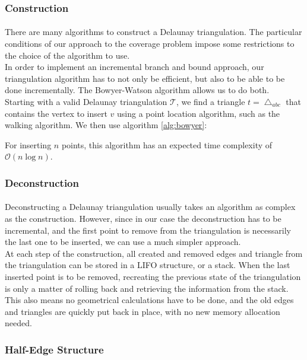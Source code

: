 \subsubsection{Construction}
\label{sect:dtconst}
\paragraph{}
There are many algorithms to construct a Delaunay triangulation. 
The particular conditions of our approach to the coverage problem impose some restrictions to the choice of the algorithm to use.\\
In order to implement an incremental branch and bound approach, our triangulation algorithm has to not only be efficient, but also to be able to be done incrementally. The Bowyer-Watson algorithm allows us to do both.\\
Starting with a valid Delaunay triangulation $\mathcal{T}$, we find a triangle $t = \bigtriangleup_{abc}$ that contains the vertex to insert $v$ using a point location algorithm, such as the walking algorithm. We then use algorithm \ref{alg:bowyer}:

\noindent 
For inserting $n$ points, this algorithm has an expected time complexity of $\mathcal{O}(n \log n)$.

\subsubsection{Deconstruction}
\paragraph{}
Deconstructing a Delaunay triangulation usually takes an algorithm as complex as the construction. However, since in our case the deconstruction has to be incremental, and the first point to remove from the triangulation is necessarily the last one to be inserted, we can use a much simpler approach. \\
At each step of the construction, all created and removed edges and triangle from the triangulation can be stored in a LIFO structure, or a stack. When the last inserted point is to be removed, recreating the previous state of the triangulation is only a matter of rolling back and retrieving the information from the stack. This also means no geometrical calculations have to be done, and the old edges and triangles are quickly put back in place, with no new memory allocation needed.
\subsubsection{Half-Edge Structure}
